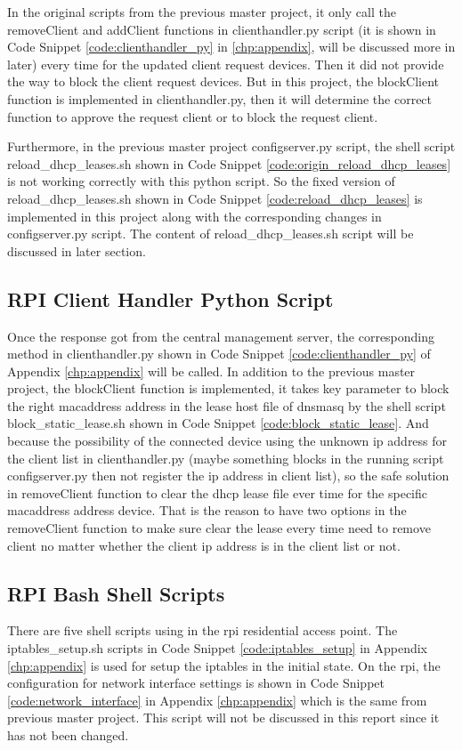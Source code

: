 \par In the original scripts from the previous master project, it only call the removeClient and addClient functions in clienthandler.py script (it is shown in Code Snippet \ref{code:clienthandler_py} in \ref{chp:appendix}, will be discussed more in later) every time for the updated client request devices. Then it did not provide the way to block the client request devices. But in this project, the blockClient function is implemented in clienthandler.py, then it will determine the correct function to approve the request client or to block the request client.
\par Furthermore, in the previous master project configserver.py script, the shell script reload\_dhcp\_leases.sh shown in Code Snippet \ref{code:origin_reload_dhcp_leases} is not working correctly with this python script. So the fixed version of reload\_dhcp\_leases.sh shown in Code Snippet \ref{code:reload_dhcp_leases} is implemented in this project along with the corresponding changes in configserver.py script. The content of reload\_dhcp\_leases.sh script will be discussed in later section.

\subsection{RPI Client Handler Python Script}
\par Once the response got from the central management server, the corresponding method in clienthandler.py shown in Code Snippet \ref{code:clienthandler_py} of Appendix \ref{chp:appendix} will be called. In addition to the previous master project, the blockClient function is implemented, it takes key parameter to block the right \gls{macaddress} address in the lease host file of dnsmasq by the shell script block\_static\_lease.sh shown in Code Snippet \ref{code:block_static_lease}. And because the possibility of the connected device using the unknown \gls{ip} address for the client list in clienthandler.py (maybe something blocks in the running script configserver.py then not register the \gls{ip} address in client list), so the safe solution in removeClient function to clear the \gls{dhcp} lease file ever time for the specific \gls{macaddress} address device. That is the reason to have two options in the removeClient function to make sure clear the lease every time need to remove client no matter whether the client \gls{ip} address is in the client list or not.

\subsection{RPI Bash Shell Scripts}
\par There are five shell scripts using in the \gls{rpi} residential access point. The iptables\_setup.sh scripts in Code Snippet \ref{code:iptables_setup} in Appendix \ref{chp:appendix} is used for setup the iptables in the initial state. On the \gls{rpi}, the configuration for network interface settings is shown in Code Snippet \ref{code:network_interface} in Appendix \ref{chp:appendix} which is the same from previous master project. This script will not be discussed in this report since it has not been changed.
